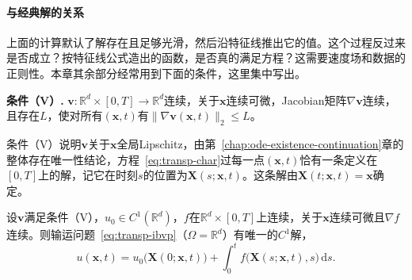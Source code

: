 \paragraph{与经典解的关系}
上面的计算默认了解存在且足够光滑，然后沿特征线推出它的值。这个过程反过来是否成立？按特征线公式造出的函数，是否真的满足方程？这需要速度场和数据的正则性。本章其余部分经常用到下面的条件，这里集中写出。

\medskip
\noindent\textbf{条件（V）.} $\bm{v}:\mathbb{R}^{d}\times[0,T]\to\mathbb{R}^{d}$连续，关于$\bm{x}$连续可微，Jacobian矩阵$\nabla\bm{v}$连续，且存在$L$，使对所有$(\bm{x},t)$有$\lVert\nabla\bm{v}(\bm{x},t)\rVert_2\leq L$。
\medskip

条件（V）说明$\bm{v}$关于$\bm{x}$全局Lipschitz，由第~\ref{chap:ode-existence-continuation}章的整体存在唯一性结论，方程~\eqref{eq:transp-char}过每一点$(\bm{x},t)$恰有一条定义在$[0,T]$上的解，记它在时刻$s$的位置为$\bm{X}(s;\bm{x},t)$。这条解由$\bm{X}(t;\bm{x},t)=\bm{x}$确定。

\begin{theorem}[特征线解与经典解]
\label{thm:transp-classical}
设$\bm{v}$满足条件（V），$u_0\in C^{1}(\mathbb{R}^{d})$，$f$在$\mathbb{R}^{d}\times[0,T]$上连续，关于$\bm{x}$连续可微且$\nabla f$连续。则输运问题~\eqref{eq:transp-ibvp}（$\Omega=\mathbb{R}^{d}$）有唯一的$C^{1}$解，
\begin{equation}
  u(\bm{x},t)=u_0\bigl(\bm{X}(0;\bm{x},t)\bigr)+\int_0^{t}f\bigl(\bm{X}(s;\bm{x},t),s\bigr)\,\mathrm{d}s.
  \label{eq:transp-char-solution}
\end{equation}
\end{theorem}

